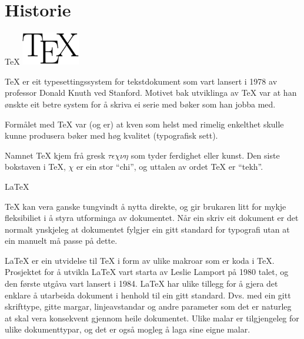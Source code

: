 	\section{Historie}
\label{sec:history}

\begin{frame}{\TeX}
  \includegraphics[width=1in]{img/tex_logo.png}
  
  	\TeX{} er eit typesettingssystem for tekstdokument som vart lansert i 1978 av professor Donald Knuth ved Stanford. Motivet bak utviklinga av \TeX{} var at han ønskte eit betre system for å skriva ei serie med bøker som han jobba med.
  	
	
	Formålet med \TeX{} var (og er) at kven som helst med rimelig enkelthet skulle kunne produsera bøker med høg kvalitet (typografisk sett).
	
	Namnet \TeX{} kjem frå gresk \(\tau\epsilon\chi\nu\eta\) som tyder ferdighet eller kunst. Den siste bokstaven i \TeX{}, $\chi$ er ein stor ``chi'', og uttalen av ordet \TeX{} er ``tekh''.
	
\end{frame}

\begin{frame}{\LaTeX}
	
	
	
	\TeX{} kan vera ganske tungvindt å nytta direkte, og gir brukaren litt for mykje fleksibiliet i å styra utforminga av dokumentet. Når ein skriv eit dokument er det normalt ynskjeleg at dokumentet fylgjer ein gitt standard for typografi utan at ein manuelt må passe på dette.
	
	\LaTeX{} er ein utvidelse til \TeX{} i form av ulike makroar som er koda i \TeX{}. Prosjektet for å utvikla \LaTeX{} vart starta av Leslie Lamport på 1980 talet, og den første utgåva vart lansert i 1984. \LaTeX{} har ulike tillegg for å gjera det enklare å utarbeida dokument i henhold til ein gitt standard. Dvs. med ein gitt skrifttype, gitte margar, linjeavstandar og andre parameter som det er naturleg at skal vera konsekvent gjennom heile dokumentet. Ulike malar er tilgjengeleg for ulike dokumenttypar, og det er også mogleg å laga sine eigne malar.
	
\end{frame}


